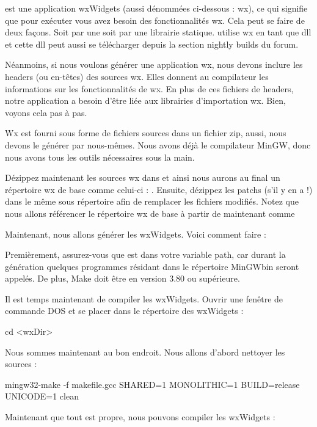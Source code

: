 \codeblocks est une application wxWidgets (aussi dénommées ci-dessous : wx), ce qui signifie que pour exécuter \codeblocks vous avez besoin des fonctionnalités wx. Cela peut se faire de deux façons. Soit par une  soit par une librairie statique. \codeblocks utilise wx en tant que dll et cette dll peut aussi se télécharger depuis la section nightly builds du forum.

Néanmoins, si nous voulons générer une application wx, nous devons inclure les headers (ou en-têtes) des sources wx. Elles donnent au compilateur les informations sur les fonctionnalités de wx. En plus de ces fichiers de headers, notre application a besoin d'être liée aux librairies d'importation wx. Bien, voyons cela pas à pas.

Wx est fourni sous forme de fichiers sources dans un fichier zip, aussi, nous devons le générer par nous-mêmes. Nous avons déjà le compilateur MinGW, donc nous avons tous les outils nécessaires sous la main.

Dézippez maintenant les sources wx dans  et ainsi nous aurons au final un répertoire wx de base comme celui-ci : . Ensuite, dézippez les patchs (s'il y en a !) dans le même sous répertoire afin de remplacer les fichiers modifiés. Notez que nous allons référencer le répertoire wx de base à partir de maintenant comme 

Maintenant, nous allons générer les wxWidgets. Voici comment faire :

Premièrement, assurez-vous que  est dans votre variable path, car durant la génération quelques programmes résidant dans le répertoire MinGW\osp bin seront appelés. De plus, Make doit être en version 3.80 ou supérieure.

Il est temps maintenant de compiler les wxWidgets. Ouvrir une fenêtre de commande DOS et se placer dans le répertoire des wxWidgets :

\begin{cmd}
cd <wxDir>\build\msw
\end{cmd}

Nous sommes maintenant au bon endroit. Nous allons d'abord nettoyer les sources :

\begin{cmd}
mingw32-make -f makefile.gcc SHARED=1 MONOLITHIC=1 BUILD=release UNICODE=1 clean
\end{cmd}

Maintenant que tout est propre, nous pouvons compiler les wxWidgets :

